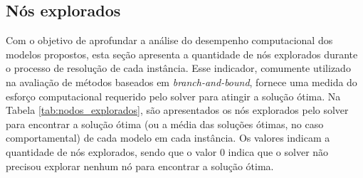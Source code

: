 \subsection{Nós explorados}
Com o objetivo de aprofundar a análise do desempenho computacional dos modelos propostos, esta seção apresenta a quantidade de nós explorados durante o processo de resolução de cada instância. Esse indicador, comumente utilizado na avaliação de métodos baseados em \textit{branch-and-bound}, fornece uma medida do esforço computacional requerido pelo solver para atingir a solução ótima. Na Tabela \ref{tab:nodos_explorados}, são apresentados os nós explorados pelo solver para encontrar a solução ótima (ou a média das soluções ótimas, no caso comportamental) de cada modelo em cada instância. Os valores indicam a quantidade de nós explorados, sendo que o valor 0 indica que o solver não precisou explorar nenhum nó para encontrar a solução ótima.

